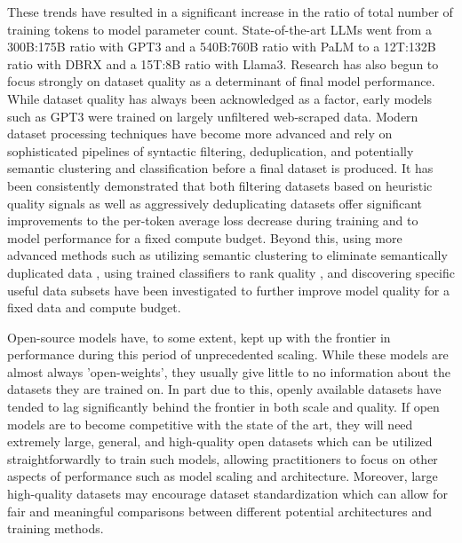 \documentclass{article}
\begin{document}
These trends have resulted in a significant increase in the ratio of total number of training tokens to model parameter count. State-of-the-art LLMs went from a 300B:175B ratio with GPT3 and a 540B:760B ratio with PaLM to a 12T:132B ratio with DBRX \citep{mosaic2024dbrx} and a 15T:8B ratio with Llama3. 
Research has also begun to focus strongly on dataset quality as a determinant of final model performance. 
While dataset quality has always been acknowledged as a factor, early models such as GPT3 \citep{brown2020language} were trained on largely unfiltered web-scraped data. 
Modern dataset processing techniques have become more advanced and rely on sophisticated pipelines of syntactic filtering, deduplication, and potentially semantic clustering and classification before a final dataset is produced. 
It has been consistently demonstrated that both filtering datasets \citep{rae2021scaling,elazar2023whats,raffel2020exploring} based on heuristic quality signals as well as aggressively deduplicating datasets \citep{lee2021deduplicating} offer significant improvements to the per-token average loss decrease during training and to model performance for a fixed compute budget. 
Beyond this, using more advanced methods such as utilizing semantic clustering to eliminate semantically duplicated data \citep{abbas2023semdedup,tirumala2024d4}, using trained classifiers to rank quality \citep{xie2023data,ilyas2022datamodels}, and discovering specific useful data subsets \citep{xie2024doremi} have been investigated to further improve model quality for a fixed data and compute budget. %

Open-source models have, to some extent, kept up with the frontier in performance during this period of unprecedented scaling. While these models \citep{touvron2023llama,team2024gemma,jiang2023mistral} are almost always 'open-weights', they usually give little to no information about the datasets they are trained on.
In part due to this, openly available datasets have tended to lag significantly behind the frontier in both scale and quality. 
If open models are to become competitive with the state of the art, they will need extremely large, general, and high-quality open datasets which can be utilized straightforwardly to train such models, allowing practitioners to focus on other aspects of performance such as model scaling and architecture.
Moreover, large high-quality datasets may encourage dataset standardization which can allow for fair and meaningful comparisons between different potential architectures and training methods. 
\end{document}
